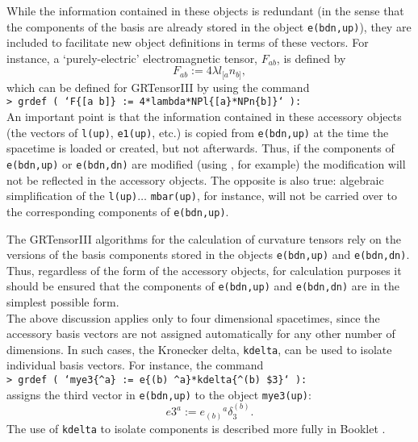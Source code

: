 \documentclass{article}
\begin{document}
While the information contained in these objects is redundant (in the
sense that the components of the basis are already stored in the
object \texttt{e(bdn,up)}), they are included to facilitate new object
definitions in terms of these vectors. For instance, a
`purely-electric' electromagnetic tensor, $F_{ab}$, is defined by
\[
  F_{ab} := 4 \lambda l_{[a} n_{b]},
\]
which can be defined for GRTensorIII by using the command\\

\noindent\texttt{> grdef ( `F\{[a b]\} := 4*lambda*NPl\{[a\}*NPn\{b]\}` ):}\\

An important point is that the information contained in these
accessory objects (the vectors of \texttt{l(up)}, \texttt{e1(up)},
etc.) is copied from \texttt{e(bdn,up)} at the time the spacetime is
loaded or created, but not afterwards. Thus, if the components of
\texttt{e(bdn,up)} or \texttt{e(bdn,dn)} are modified (using
, for example) the modification will not be reflected
in the accessory objects. The opposite is also true: algebraic
simplification of the \texttt{l(up)}$\ldots$ \texttt{mbar(up)}, for
instance, will not be carried over to the corresponding components of
\texttt{e(bdn,up)}.

The GRTensorIII algorithms for the calculation of curvature tensors
rely on the versions of the basis components stored in the objects
\texttt{e(bdn,up)} and \texttt{e(bdn,dn)}. Thus, regardless of the
form of the accessory objects, for calculation purposes it should be
ensured that the components of \texttt{e(bdn,up)} and
\texttt{e(bdn,dn)} are in the simplest possible form.\\

The above discussion applies only to four dimensional spacetimes,
since the accessory basis vectors are not assigned automatically for any other
number of dimensions. In such cases, the Kronecker delta,
\texttt{kdelta}, can be used to isolate individual basis vectors.
For instance, the command\\

\noindent\texttt{> grdef (
  `mye3\{\^{}a\} := e\{(b) \^{}a\}*kdelta\{\^{}(b) \$3\}` ):}\\

\noindent assigns the third vector in \texttt{e(bdn,up)} to the object
\texttt{mye3(up)}:
\[
  e3^a := e_{(b)}{}^a \delta^{(b)}_3.
\]
The use of \texttt{kdelta} to isolate components is described more
fully in Booklet \grDefRef.
\end{document}
